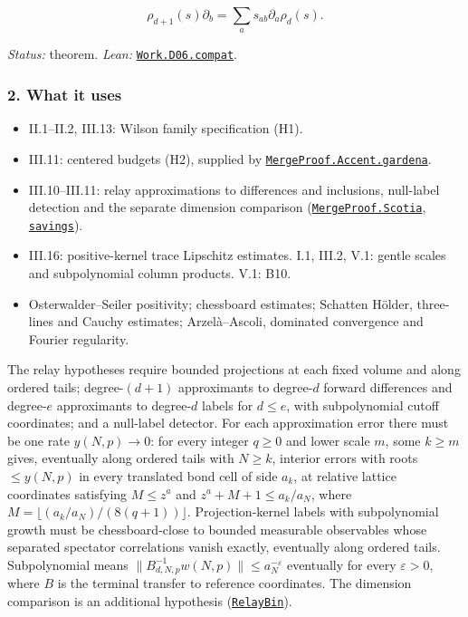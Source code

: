 \documentclass[
  letterpaper,
  11pt]{article}
\providecommand{\tightlist}{%
  \setlength{\itemsep}{0pt}\setlength{\parskip}{0pt}}
\begin{document}
\[\rho_{d+1}(s)\partial_b=\sum_a s_{ab}\partial_a\rho_d(s).\]

\emph{Status:} theorem. \emph{Lean:}
\href{https://github.com/yang-mills-group/OpenAI-YM-20261028/blob/3456e5e75cf8d4cd558955a5c7638fba2d68f464/YM/Work/D06.lean\#L98-L135}{\texttt{Work.D06.compat}}.

\subsubsection{2. What it uses}\label{what-it-uses-19}

\begin{itemize}
\tightlist
\item
  II.1--II.2, III.13: Wilson family specification (H1).
\item
  III.11: centered budgets (H2), supplied by
  \href{https://github.com/yang-mills-group/OpenAI-YM-20261028/blob/3456e5e75cf8d4cd558955a5c7638fba2d68f464/YM/MergeProof/Gardens.lean\#L19-L40}{\texttt{MergeProof.Accent.gardena}}.
\item
  III.10--III.11: relay approximations to differences and inclusions,
  null-label detection and the separate dimension comparison
  (\href{https://github.com/yang-mills-group/OpenAI-YM-20261028/blob/3456e5e75cf8d4cd558955a5c7638fba2d68f464/YM/MergeProof/Eureka.lean\#L16-L20}{\texttt{MergeProof.Scotia}},
  \href{https://github.com/yang-mills-group/OpenAI-YM-20261028/blob/3456e5e75cf8d4cd558955a5c7638fba2d68f464/YM/MergeProof/Powder.lean\#L19-L47}{\texttt{savings}}).
\item
  III.16: positive-kernel trace Lipschitz estimates. I.1, III.2, V.1:
  gentle scales and subpolynomial column products. V.1: B10.
\item
  Osterwalder--Seiler positivity; chessboard estimates; Schatten Hölder,
  three-lines and Cauchy estimates; Arzelà--Ascoli, dominated
  convergence and Fourier regularity.
\end{itemize}

The relay hypotheses require bounded projections at each fixed volume
and along ordered tails; degree-\((d+1)\) approximants to degree-\(d\)
forward differences and degree-\(e\) approximants to degree-\(d\) labels
for \(d\le e\), with subpolynomial cutoff coordinates; and a null-label
detector. For each approximation error there must be one rate
\(y(N,p)\to0\): for every integer \(q\ge0\) and lower scale \(m\), some
\(k\ge m\) gives, eventually along ordered tails with \(N\ge k\),
interior errors with roots \(\le y(N,p)\) in every translated bond cell
of side \(a_k\), at relative lattice coordinates satisfying \(M\le z^a\)
and \(z^a+M+1\le a_k/a_N\), where
\(M=\lfloor(a_k/a_N)/(8(q+1))\rfloor\). Projection-kernel labels with
subpolynomial growth must be chessboard-close to bounded measurable
observables whose separated spectator correlations vanish exactly,
eventually along ordered tails. Subpolynomial means
\(\|B_{d,N,p}^{-1}w(N,p)\|\le a_N^{-\varepsilon}\) eventually for every
\(\varepsilon>0\), where \(B\) is the terminal transfer to reference
coordinates. The dimension comparison is an additional hypothesis
(\href{https://github.com/yang-mills-group/OpenAI-YM-20261028/blob/3456e5e75cf8d4cd558955a5c7638fba2d68f464/YM/Bid/Drops.lean\#L46-L52}{\texttt{RelayBin}}).
\end{document}
